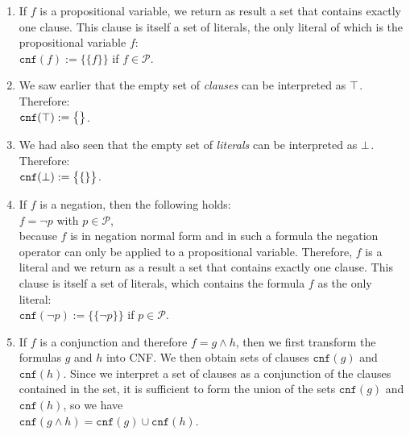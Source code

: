 \begin{enumerate}
\item If $f$ is a propositional variable, we return as result a set that contains exactly one
      clause.  This clause is itself a set of literals, the only literal of which is the
      propositional variable $f$:
      \\[0.2cm]
      \hspace*{1.3cm}
      $\texttt{cnf}(f) := \bigl\{\{f\}\bigr\}$ \quad if $f \in \mathcal{P}$.
\item We saw earlier that the empty set of \emph{clauses} can be interpreted as $\top$.
      Therefore:
      \\[0.2cm]
      \hspace*{1.3cm}
      $\texttt{cnf}(\top) := \bigl\{\bigr\}$.      
\item We had also seen that the empty set of \emph{literals} can be interpreted as $\bot$.
      Therefore:
      \\[0.2cm]
      \hspace*{1.3cm}
      $\texttt{cnf}(\bot) := \bigl\{\{\}\bigr\}$.      
\item If $f$ is a negation, then the following holds:
      \\[0.2cm]
      \hspace*{1.3cm}
      $f = \neg p$ \quad with $p \in \mathcal{P}$,
      \\[0.2cm]
      because $f$ is in negation normal form and in such a formula the negation operator can only be applied to
      a propositional variable.  Therefore, $f$ is a literal and we return as a result
      a set that contains exactly one clause.  This clause is itself a set of
      literals, which contains the formula $f$ as the only literal:
      \\[0.2cm]
      \hspace*{1.3cm}
      $\texttt{cnf}(\neg p) := \bigl\{\{\neg p\}\bigr\}$ \quad if $p \in \mathcal{P}$.
\item If $f$ is a conjunction and therefore $f = g \wedge h$, then we 
      first transform the formulas $g$ and $h$ into CNF.  We then obtain sets of clauses 
      $\texttt{cnf}(g)$ and $\texttt{cnf}(h)$.  Since we interpret a set of clauses as a conjunction of the clauses contained in the set,
      it is sufficient to form the union of the sets $\texttt{cnf}(g)$ and $\texttt{cnf}(h)$,
      so we have \\[0.2cm]
      \hspace*{1.3cm} $\texttt{cnf}(g \wedge h) = \texttt{cnf}(g) \cup \texttt{cnf}(h)$.

\end{enumerate}
